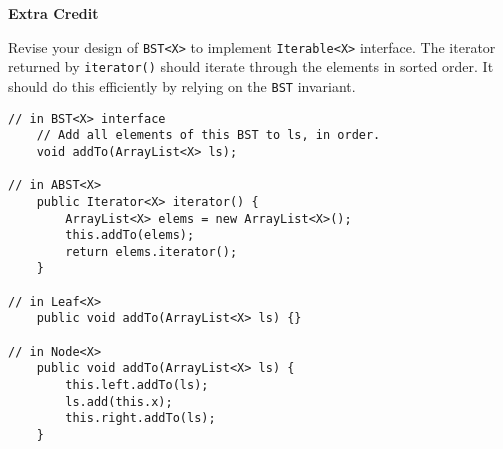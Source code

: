 \documentclass[12pt]{article}                   %
\def\pts#1{\marginpar{\footnotesize \raggedright  \fbox{#1 {\sc Points}}}}
\newenvironment{solution}{\color{Red}}{}
\begin{document}
\ifrubric
\else
{}
\fi
\newpage

\begin{problem}  \pts{5}

{\bf Extra Credit}

\noindent
Revise your design of \texttt{BST<X>} to implement
 \texttt{Iterable<X>} interface.  The iterator returned by
 \texttt{iterator()} should iterate through the elements in sorted order.
 It should do this efficiently by relying on the \texttt{BST} invariant.

\begin{solution}
\begin{verbatim}
// in BST<X> interface
    // Add all elements of this BST to ls, in order.
    void addTo(ArrayList<X> ls);

// in ABST<X>
    public Iterator<X> iterator() {
        ArrayList<X> elems = new ArrayList<X>();
        this.addTo(elems);
        return elems.iterator();
    }

// in Leaf<X>
    public void addTo(ArrayList<X> ls) {}

// in Node<X>
    public void addTo(ArrayList<X> ls) {
        this.left.addTo(ls);
        ls.add(this.x);
        this.right.addTo(ls);
    }
\end{verbatim}
\end{solution}

\end{problem}

\end{document}
